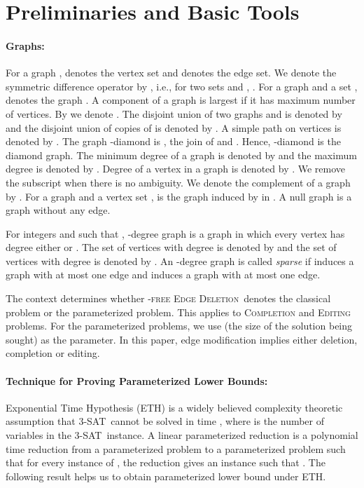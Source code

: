 \documentclass[envcountsame,envcountsect,10pt,oribibl]{llncs}
\newcommand{\pname}[1]{\textnormal{\textsc{#1}}}
\newcommand{\HED}{\pname{-free Edge Deletion}}
\newcommand{\TSAT}{\pname{3-SAT}}
\begin{document}
\section{Preliminaries and Basic Tools}
\label{sec:prebasics}

\paragraph{\textbf{Graphs:}}

For a graph ,  denotes the vertex set and 
 denotes the edge set. We denote the symmetric
difference operator by , i.e., for two sets  and ,
.
For a graph  and a set , 
denotes the graph . A component of a graph is largest
if it has maximum number of vertices. By  we denote .
The disjoint union of two graphs  and  is denoted by 
and the disjoint union of  copies of  is denoted by .
A simple path on  vertices is denoted by .
The graph -diamond is , the join of  and . 
Hence, -diamond is the diamond graph.
The minimum degree of a graph  is denoted by 
and the maximum degree is denoted by .
Degree of a vertex  in a graph  is denoted by .
We remove the subscript when there is no ambiguity.
We denote the complement of a graph  by .
For a graph  and a vertex set ,
 is the graph induced by  in .
A null graph is a graph without any edge.

For integers  and  such that , -degree graph is a graph in which 
every vertex has degree either  or . The set of vertices with degree 
is denoted by  and the set of vertices with degree  is denoted by . 
An -degree graph is called \emph{sparse} if  induces a graph with at most 
one edge and  induces a graph with at most one edge.


The context determines whether \HED\ denotes the classical problem or the parameterized
problem. This applies to \textsc{Completion} and \textsc{Editing} problems.
For the parameterized problems, 
we use  (the size of the solution being sought) as the parameter.
In this paper, edge modification implies either deletion, completion or editing.

\paragraph{\textbf{Technique for Proving Parameterized Lower Bounds:}}
Exponential Time Hypothesis (ETH) is a widely believed complexity theoretic
assumption that \TSAT\ 
cannot be solved in time , where 
 is the number of variables in
the \TSAT\ instance. 
A linear parameterized reduction is a polynomial time reduction
from a parameterized problem  to a parameterized problem 
such that for every instance  of , the reduction gives
an instance  such that . The following
result helps us to obtain parameterized lower bound under ETH.
\end{document}
